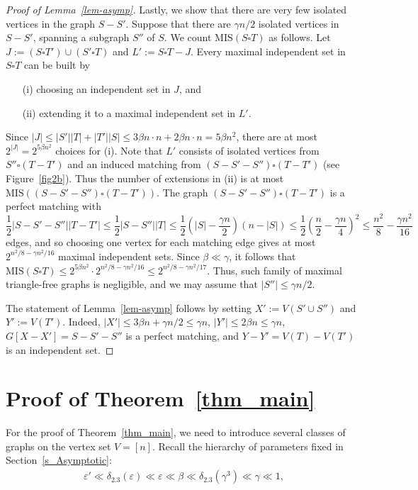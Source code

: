 \documentclass[12pt]{article}
\theoremstyle{definition}
\theoremstyle{definition}
\theoremstyle{definition}
\theoremstyle{definition}
\theoremstyle{definition}
\theoremstyle{definition}
\theoremstyle{definition}
\newcommand{\ep}{\varepsilon}
\newcommand{\de}{\delta}
\newcommand{\ga}{\gamma}
\newcommand{\3}{\bf{3}}
\newcommand{\MIS}{\mathrm{MIS}}
\begin{document}
\begin{proof}[Proof of Lemma~\ref{lem-asymp}]
Lastly, we show that there are very few isolated vertices in the graph $S-S'$. Suppose that there are $\ga n/2$ isolated vertices in $S-S'$, spanning a subgraph $S''$ of $S$. We count $\MIS(S\square T)$ as follows.
Let $J:=(S\square T') \cup (S'\square T)$ and $L':=S\square T- J$. Every maximal independent set in $S\square T$ can be built by 
\begin{enumerate}
\setlength{\itemsep}{1pt}
  \setlength{\parskip}{0pt}
  \setlength{\parsep}{0pt}
\item[(i)] choosing an independent set in $J$, and 
\item[(ii)] extending it to a maximal independent set in $L'$. 
\end{enumerate}
Since $|J|\leq |S'||T|+|T'||S|\leq 3\beta n \cdot n+ 2\beta n \cdot n=5\beta n^2$, there are at most $2^{|J|}=2^{5\beta n^2}$ choices for (i). Note that $L'$ consists of isolated vertices from $S''\square(T- T')$ and an induced matching from $(S-S'-S'')\square (T-T')$ (see Figure~\ref{fig2b}). Thus the number of extensions in (ii) is at most $\MIS((S-S'-S'')\square (T-T'))$. The graph $(S-S'-S'')\square (T-T')$ is a perfect matching with 
$$\frac{1}{2}|S-S'-S''||T-T'|\leq \frac{1}{2}|S-S''||T|\leq\frac{1}{2}\left(|S|-\frac{\ga n}{2}\right)(n-|S|) \leq \frac{1}{2}\left(\frac{n}{2}-\frac{\ga n}{4}\right)^2\le \frac{n^2}{8}-\frac{\ga n^2}{16}$$ 
edges, and so choosing one vertex for each matching edge gives at most $2^{n^2/8-\ga n^2/16}$ maximal independent sets. Since $\beta\ll\ga$, it follows that $\MIS(S\square T)\leq 2^{5\beta n^2}\cdot 2^{n^2/8-\ga n^2/16}
\le 2^{n^2/8-\ga n^2/17}$. Thus, such family of maximal triangle-free graphs is negligible, and we may assume that $|S''|\le\ga n/2$.

 The statement of Lemma~\ref{lem-asymp} follows by setting $X':=V(S'\cup S'')$ and $Y':=V(T')$. Indeed, $|X'|\leq 3\beta n+ \gamma n/2\le \gamma n$, $|Y'|\leq 2\beta n\le \gamma n$, $G[X-X']=S-S'-S''$ is a perfect matching, and $Y-Y'=V(T)-V(T')$ is an independent set.


\end{proof}

\section{Proof of Theorem~\ref{thm_main}}\label{s_Proof}
For the proof of Theorem~\ref{thm_main}, we need to introduce several classes of graphs on the vertex set $V=[n]$. Recall the hierarchy of parameters fixed in Section~\ref{s_Asymptotic}:
\begin{eqnarray}%
\ep'\ll\de_{2.3}(\ep)\ll\ep\ll\beta\ll\de_{2.3}(\ga^3)\ll\ga\ll 1,
\end{eqnarray}
\end{document}
